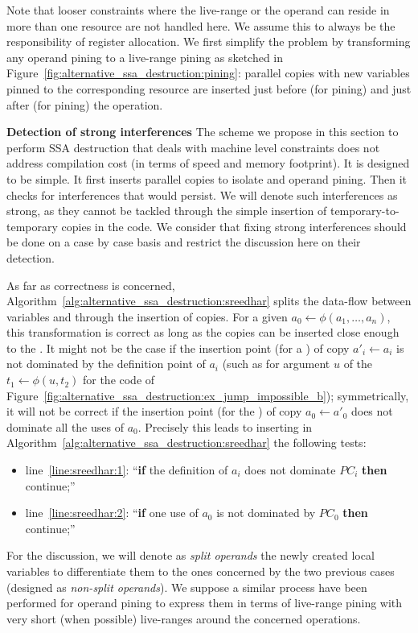 Note that looser constraints where the live-range or the operand can reside in more than one resource are not handled here. We assume this to always be the responsibility of register allocation.
We first simplify the problem by transforming any operand pining to a live-range pining as sketched in Figure~\ref{fig:alternative_ssa_destruction:pining}: parallel copies with new variables pinned to the corresponding resource are inserted just before (for \useop pining) and just after (for  pining) the operation.




{\bf Detection of strong interferences}
\label{par:alternative_ssa_destruction:strong}
The scheme we propose in this section to perform SSA destruction that deals with machine level constraints does not address compilation cost (in terms of speed and memory footprint). It is designed to be simple. It first inserts parallel copies to isolate \phifuns and operand pining. Then it checks for interferences that would persist. We will denote such interferences as strong, as they cannot be tackled through the simple insertion of temporary-to-temporary copies in the code. We consider that fixing strong interferences should be done on a case by case basis and restrict the discussion here on their detection.

As far as correctness is concerned, Algorithm~\ref{alg:alternative_ssa_destruction:sreedhar} splits the data-flow between variables and \phinodes through the insertion of copies. For a given \phifun $a_0\gets \phi(a_1,\dots,a_n)$, this transformation is correct as long as the copies can be inserted close enough to the \phifun. It might not be the case if the insertion point (for a \useop) of copy $a'_i\gets a_i$ is not dominated by the definition point of $a_i$ (such as for argument $u$ of the \phifun $t_1\gets \phi(u,t_2)$ for the code of Figure~\ref{fig:alternative_ssa_destruction:ex_jump_impossible_b}); symmetrically, it will not be correct if the insertion point (for the ) of copy $a_0\gets a'_0$ does not dominate all the uses of $a_0$. Precisely this leads to inserting in Algorithm~\ref{alg:alternative_ssa_destruction:sreedhar} the following tests:
\begin{itemize}
\item line~\ref{line:sreedhar:1}: ``{\bf if} the definition of $a_i$ does not dominate $PC_i$ {\bf then} continue;''
\item line~\ref{line:sreedhar:2}: ``{\bf if} one use of $a_0$ is not dominated by $PC_0$ {\bf then} continue;''
\end{itemize}
For the discussion, we will denote as \emph{split operands} the newly created local variables to differentiate them to the ones concerned by the two previous cases (designed as \emph{non-split operands}).
% 
We suppose a similar process have been performed for operand pining to express them in terms of live-range pining with very short (when possible) live-ranges around the concerned operations. 

